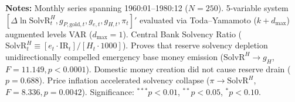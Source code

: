 \begin{table}[htbp]
{}
\begin{minipage}{0.96\textwidth}
\vspace{0.3em}
\footnotesize \textbf{Notes:} Monthly series spanning 1960:01--1980:12 ($N=250$). 5-variable system $[\Delta \ln \text{SolvR}_t^H, g_{P,\text{gold},t}, g_{e,t}, g_{H,t}, \pi_t]'$ evaluated via Toda--Yamamoto ($k+d_{\max}$) augmented levels VAR ($d_{\max}=1$). Central Bank Solvency Ratio ($\text{SolvR}_t^H \equiv [e_t \cdot \text{IR}_t] / [H_t \cdot 1000]$). Proves that reserve solvency depletion unidirectionally compelled emergency base money emission ($\text{SolvR}^H \to g_H$, $F = 11.149, p < 0.0001$). Domestic money creation did not cause reserve drain ($p = 0.688$). Price inflation accelerated solvency collapse ($\pi \to \text{SolvR}^H$, $F = 8.336, p = 0.0042$). Significance: $^{***} p < 0.01$, $^{**} p < 0.05$, $^{*} p < 0.10$.
\end{minipage}
\end{table}
